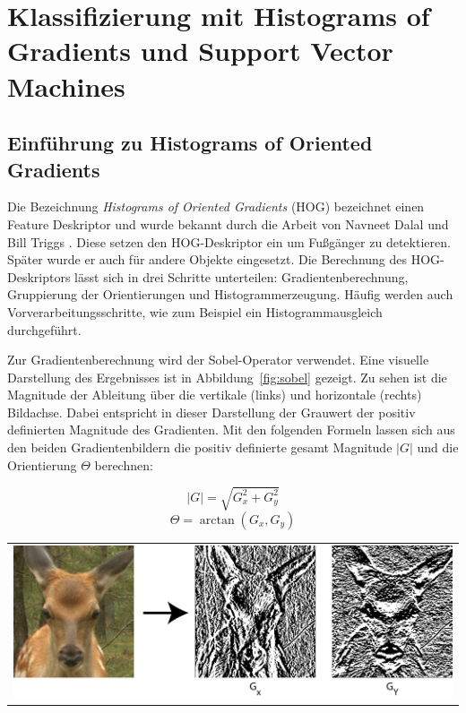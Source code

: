 \newpage
\section{Klassifizierung mit Histograms of Gradients und Support Vector Machines} \label{sec:HOG}


\subsection{Einführung zu Histograms of Oriented Gradients} \label{ssec:intro_HOG}

Die Bezeichnung \textit{Histograms of Oriented Gradients} (HOG) bezeichnet einen Feature Deskriptor und wurde bekannt durch die Arbeit von Navneet Dalal und Bill Triggs \cite{dalal05}. Diese setzen den HOG-Deskriptor ein um Fußgänger zu detektieren. Später wurde er auch für andere Objekte eingesetzt. Die Berechnung des HOG-Deskriptors lässt sich in drei Schritte unterteilen: Gradientenberechnung, Gruppierung der Orientierungen und Histogrammerzeugung. Häufig werden  auch Vorverarbeitungsschritte, wie zum Beispiel ein Histogrammausgleich durchgeführt.

Zur Gradientenberechnung wird der Sobel-Operator verwendet. Eine visuelle Darstellung des Ergebnisses ist in Abbildung~\ref{fig:sobel} gezeigt. Zu sehen ist die Magnitude der Ableitung über die vertikale (links) und horizontale (rechts) Bildachse. Dabei entspricht in dieser Darstellung der Grauwert der positiv definierten Magnitude des Gradienten. Mit den folgenden Formeln lassen sich aus den beiden Gradientenbildern die positiv definierte gesamt Magnitude $|G|$ und die Orientierung $\Theta$ berechnen:  

\begin{equation}
|G| = \sqrt{G_x^2 + G_y^2}
\end{equation}
\begin{equation}
\Theta = \arctan({G_x, G_y})
\end{equation}

\begin{center}
\begin{tabular}{c}
\includegraphics[trim={0 0cm 0cm 0cm},clip=true,width=13cm]{img/sobel.png}
\end{tabular}
\label{fig:sobel}
\end{center}

